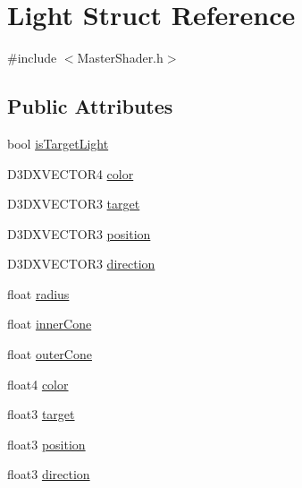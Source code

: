 \hypertarget{struct_light}{
\section{Light Struct Reference}
\label{struct_light}
}


{\ttfamily \#include $<$MasterShader.h$>$}\subsection*{Public Attributes}
\begin{DoxyCompactItemize}
\item 
bool \hyperlink{struct_light_a986bc50635faf4f74e51ebdb52354e30}{isTargetLight}
\item 
D3DXVECTOR4 \hyperlink{struct_light_a7022e45f9b09303c6ce2124f0c2eb581}{color}
\item 
D3DXVECTOR3 \hyperlink{struct_light_a6b5f6eaeab5d0d4043db3048aaaf7d2e}{target}
\item 
D3DXVECTOR3 \hyperlink{struct_light_ab44cc66400fc65c319f551330e18c8e9}{position}
\item 
D3DXVECTOR3 \hyperlink{struct_light_a5069131d68d8930ad652b027c267f0a6}{direction}
\item 
float \hyperlink{struct_light_ab9a87981b02f4612c872c49efa6b6e53}{radius}
\item 
float \hyperlink{struct_light_ab1d047732c60a9833ee0b21c08234d0a}{innerCone}
\item 
float \hyperlink{struct_light_a0badad92b7b4cf0115f0f7e2f30ab11d}{outerCone}
\item 
float4 \hyperlink{struct_light_afa605d539d182671f9627286569c130e}{color}
\item 
float3 \hyperlink{struct_light_ac7a0d5eed7975a29294ba1ff61fb75e4}{target}
\item 
float3 \hyperlink{struct_light_a3db75a1b23b53fbd4d98da10dda1d52f}{position}
\item 
float3 \hyperlink{struct_light_a786f707f208776ebd9862518452f3a42}{direction}
\end{DoxyCompactItemize}


